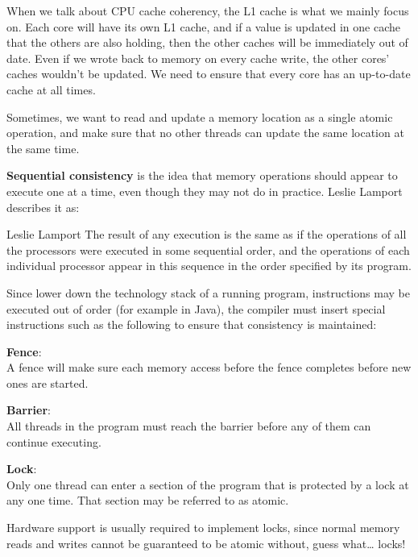 When we talk about CPU cache coherency, the L1 cache is what we mainly focus on.
Each core will have its own L1 cache, and if a value is updated in one cache
that the others are also holding, then the other caches will be immediately out
of date. Even if we wrote back to memory on every cache write, the other cores'
caches wouldn't be updated. We need to ensure that every core has an up-to-date
cache at all times.


Sometimes, we want to read and update a memory location as a single atomic
operation, and make sure that no other threads can update the same location at
the same time.

\textbf{Sequential consistency} is the idea that memory operations should appear
to execute one at a time, even though they may not do in practice. Leslie
Lamport describes it as:

\begin{aquote}{Leslie Lamport}
  The result of any execution is the same as if the operations of all the
  processors were executed in some sequential order, and the operations of each
  individual processor appear in this sequence in the order specified by its
  program.
\end{aquote}

Since lower down the technology stack of a running program, instructions may be
executed out of order (for example in Java), the compiler must insert special
instructions such as the following to ensure that consistency is maintained:

\begin{description}
  \item \textbf{Fence}:\\
    A fence will make sure each memory access before the fence completes before
    new ones are started.
  \item \textbf{Barrier}:\\
    All threads in the program must reach the barrier before any of them can
    continue executing.
  \item \textbf{Lock}:\\
    Only one thread can enter a section of the program that is protected by a 
    lock at any one time. That section may be referred to as atomic.

    Hardware support is usually required to implement locks, since normal memory
    reads and writes cannot be guaranteed to be atomic without, guess what\dots
    locks!
\end{description}

